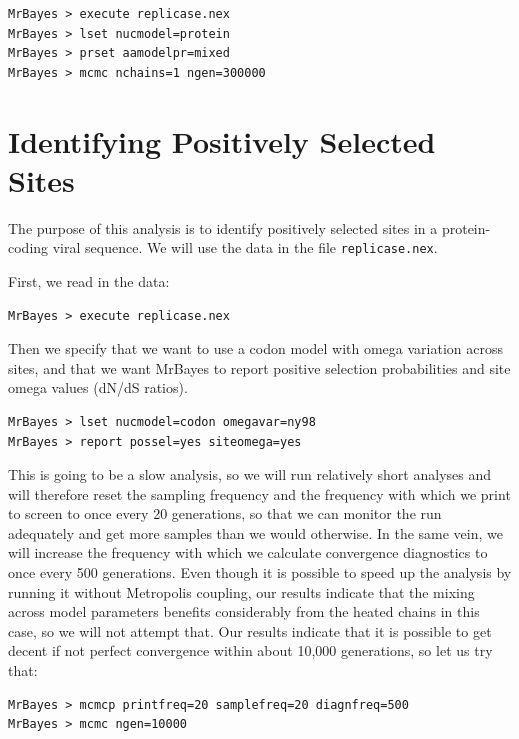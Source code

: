\documentclass[12pt]{book}
\begin{document}
\begin{singlespacing}
\begin{verbatim}
MrBayes > execute replicase.nex
MrBayes > lset nucmodel=protein
MrBayes > prset aamodelpr=mixed
MrBayes > mcmc nchains=1 ngen=300000
\end{verbatim}
\end{singlespacing}

\section{Identifying Positively Selected Sites}
The purpose of this analysis is to identify positively selected sites in a protein-coding viral
sequence.  We will use the data in the file \texttt{replicase.nex}.

First, we read in the data:

\begin{verbatim}
MrBayes > execute replicase.nex
\end{verbatim}

Then we specify that we want to use a codon model with omega variation across sites, and that we
want MrBayes to report positive selection probabilities and site omega values (dN/dS ratios).

\begin{singlespacing}
\begin{verbatim}
MrBayes > lset nucmodel=codon omegavar=ny98
MrBayes > report possel=yes siteomega=yes
\end{verbatim}
\end{singlespacing}

This is going to be a slow analysis, so we will run relatively short analyses and will therefore
reset the sampling frequency and the frequency with which we print to screen to once every 20
generations, so that we can monitor the run adequately and get more samples than we would
otherwise. In the same vein, we will increase the frequency with which we calculate convergence
diagnostics to once every 500 generations. Even though it is possible to speed up the analysis by
running it without Metropolis coupling, our results indicate that the mixing across model
parameters benefits considerably from the heated chains in this case, so we will not attempt that.
Our results indicate that it is possible to get decent if not perfect convergence within about
10,000 generations, so let us try that:

\begin{singlespacing}
\begin{verbatim}
MrBayes > mcmcp printfreq=20 samplefreq=20 diagnfreq=500
MrBayes > mcmc ngen=10000
\end{verbatim}
\end{singlespacing}
\end{document}
